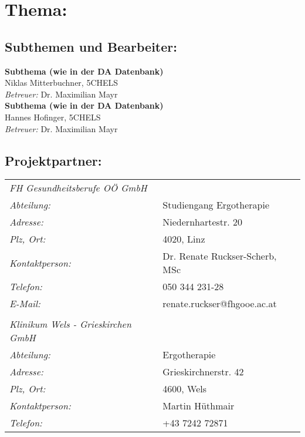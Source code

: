 

\chapter*{Thema: \newline \htlArbeitsthema }



\section*{Subthemen und Bearbeiter:}


\textbf{Subthema (wie in der DA Datenbank)}\\ 
Niklas Mitterbuchner, 5CHELS\\
\emph{Betreuer:} Dr. Maximilian Mayr\\[2ex] 
%
\textbf{Subthema (wie in der DA Datenbank)}\\ 
Hannes Hofinger, 5CHELS\\
\emph{Betreuer:} Dr. Maximilian Mayr\\[2ex] 



\section*{Projektpartner:}

\renewcommand{\arraystretch}{1.5}
\begin{tabularx}{1\textwidth}{@{} l X @{}}

\emph{FH Gesundheitsberufe OÖ GmbH}\\
\emph{Abteilung:} & Studiengang Ergotherapie\\
\emph{Adresse:} & Niedernhartestr. 20\\
\emph{Plz, Ort:} & 4020, Linz\\
\emph{Kontaktperson:} & Dr. Renate Ruckser-Scherb, MSc\\
\emph{Telefon:} & 050 344 231-28\\
\emph{E-Mail:} & renate.ruckser@fhgooe.ac.at\\
\emph{}\\
\emph{Klinikum Wels - Grieskirchen GmbH}\\
\emph{Abteilung:} & Ergotherapie\\
\emph{Adresse:} & Grieskirchnerstr. 42\\
\emph{Plz, Ort:} & 4600, Wels\\
\emph{Kontaktperson:} & Martin Hüthmair\\
\emph{Telefon:} & +43 7242 72871\\


\end{tabularx}
